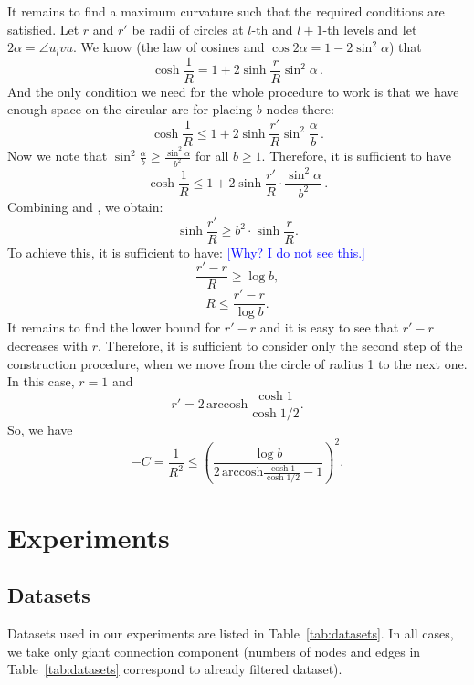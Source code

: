 \documentclass{article} %
\newcommand{\ph}[1]{\textcolor{blue}{#1}}
\newcommand{\lt}[1]{\textcolor{red}{#1}}
\begin{document}
It remains to find a maximum curvature such that the required conditions are satisfied. Let $r$ and $r'$ be radii of circles at $l$-th and $l+1$-th levels and let $2\alpha = \angle u_l v u$. We know (the law of cosines and $\cos 2\alpha = 1 - 2\sin^2 \alpha$) that
\begin{equation}\label{eq:1}
\cosh \frac{1}{R} = 1 + 2 \sinh \frac{r}{R} \sin^2 \alpha \,.
\end{equation}
And the only condition we need for the whole procedure to work is that we have enough space on the circular arc for placing $b$ nodes there:
\[
\cosh \frac{1}{R} \le 1 + 2 \sinh \frac{r'}{R} \sin^2 \frac{\alpha}{b} \,.
\]
Now we note that $\sin^2 \frac{\alpha}{b} \ge \frac{\sin^2 \alpha}{b^2}$ for all $b \ge 1$. Therefore, it is sufficient to have
\begin{equation}\label{eq:2}
\cosh \frac{1}{R} \le 1 + 2 \sinh \frac{r'}{R} \cdot \frac{\sin^2 \alpha}{b^2} \,.
\end{equation}
Combining  and \lt{}, we obtain:
\[
\sinh \frac{r'}{R} \ge b^2 \cdot \sinh \frac{r}{R}.
\]
To achieve this, it is sufficient to have: \ph{[Why? I do not see this.]}
\[
\frac{r' - r}{R} \ge \log b,
\]
\[
R \le \frac{r' - r}{\log b}.
\]
It remains to find the lower bound for $r' - r$ and it is easy to see that $r' - r$ decreases with $r$. Therefore, it is sufficient to consider only the second step of the construction procedure, when we move from the circle of radius 1 to the next one. In this case, $r = 1$ and 
\[
r' = 2 \, \mathrm{arccosh} \frac{\cosh 1}{\cosh 1/2}.
\]
So, we have 
\[
-C = \frac{1}{R^2} \le \left( \frac{\log b}{2 \, \mathrm{arccosh} \frac{\cosh 1}{\cosh 1/2} - 1} \right)^2.
\]



\section{Experiments}

\subsection{Datasets}\label{sec:datasets}

Datasets used in our experiments are listed in Table~\ref{tab:datasets}. In all cases, we take only giant connection component (numbers of nodes and edges in Table~\ref{tab:datasets} correspond to already filtered dataset).
\end{document}
